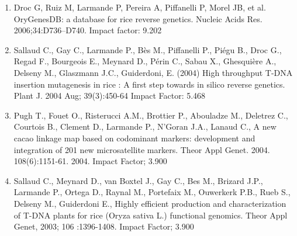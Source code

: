 \begin{enumerate}
\item	Droc G, Ruiz M, Larmande P, Pereira A, Piffanelli P, Morel JB, et al. OryGenesDB: a database for rice reverse genetics. Nucleic Acids Res. 2006;34:D736–D740. Impact factor: 9.202
\item Sallaud C., Gay C., Larmande P., Bès M., Piffanelli P., Piégu B., Droc G., Regad F., Bourgeois E., Meynard D., Périn C., Sabau X., Ghesquière A., Delseny M., Glaszmann J.C., Guiderdoni, E. (2004) High throughput T-DNA insertion mutagenesis in rice : A first step towards in silico reverse genetics. Plant J. 2004 Aug; 39(3):450-64  Impact Factor: 5.468 
\item	Pugh T., Fouet O., Risterucci A.M., Brottier P., Abouladze M., Deletrez C., Courtois B., Clement D., Larmande P., N'Goran J.A., Lanaud C., A new cacao linkage map based on codominant markers: development and integration of 201 new microsatellite markers. Theor Appl Genet. 2004. 108(6):1151-61. 2004. Impact Factor; 3.900
\item	Sallaud C., Meynard D., van Boxtel J., Gay C., Bes M., Brizard J.P., Larmande P., Ortega D., Raynal M., Portefaix M., Ouwerkerk P.B., Rueb S., Delseny M., Guiderdoni E.,  Highly efficient production and characterization of T-DNA plants for rice (Oryza sativa L.) functional genomics. Theor Appl Genet, 2003; 106 :1396-1408. Impact Factor; 3.900
\end{enumerate}

